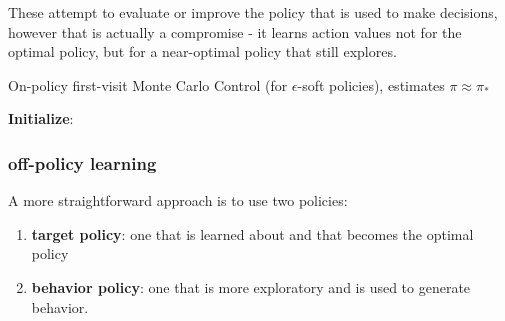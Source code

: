 These attempt to evaluate or improve the policy that is used to make decisions, however that is actually a compromise - it learns action values not for the optimal policy, but for a near-optimal policy that still explores.


\begin{algorithm}[h!]
    \caption{On-policy first-visit Monte Carlo Control (for $\epsilon$-soft policies), estimates $\pi \approx \pi_*$}

    \textbf{Initialize}: \\

\end{algorithm}


\subsubsection{off-policy learning \cite{medium/nerd-for-tech/monte-carlo-methods-for-reinforcement-learning-d30d874dd817}}\label{RL: off-policy learning}

A more straightforward approach is to use two policies:
\begin{enumerate}
    \item \textbf{target policy}: one that is learned about and that becomes the optimal policy
    \item \textbf{behavior policy}: one that is more exploratory and is used to generate behavior. 
\end{enumerate}

